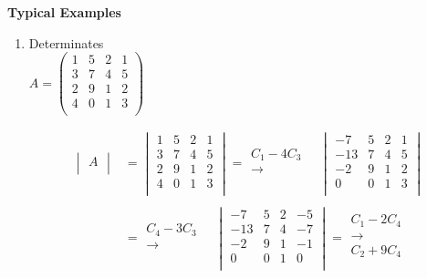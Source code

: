 \documentclass[11pt,a4paper]{article}
\theoremstyle{definition}
\begin{document}
\textbf{Typical Examples}
\begin{enumerate}
\item Determinates\\


$A = \begin{pmatrix}
1 & 5 & 2 & 1\\
3 & 7 & 4 & 5\\
2 & 9 & 1 & 2\\
4 & 0 & 1 & 3\\
\end{pmatrix}$


\begin{align*}
\begin{vmatrix}
A\\
\end{vmatrix} & = \begin{vmatrix}
1 & 5 & 2 & 1\\
3 & 7 & 4 & 5\\
2 & 9 & 1 & 2\\
4 & 0 & 1 & 3\\
\end{vmatrix} = 
\begin{matrix}
C_1 - 4C_3\\
\longrightarrow\\
\end{matrix}\quad 
\begin{vmatrix}
-7 & 5 & 2 & 1\\
-13 & 7 & 4 & 5\\
-2 & 9 & 1 & 2\\
0 & 0 & 1 & 3\\
\end{vmatrix}\\\\
& =\begin{matrix}
C_4 - 3C_3\\
\longrightarrow\\
\end{matrix}\quad 
\begin{vmatrix}
-7 & 5 & 2 & -5 \\
-13 & 7 & 4 & -7\\
-2 & 9 & 1 & -1\\
0 & 0 & 1 & 0\\
\end{vmatrix} = \begin{matrix}
C_1 - 2C_4\\
\longrightarrow\\
C_2 + 9C_4\\
\end{matrix}\quad 

\end{align*}
\end{enumerate}
\end{document}
